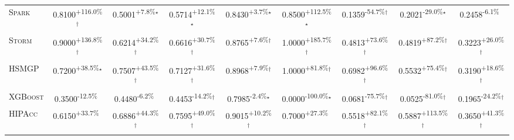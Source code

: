 \begin{table}[htbp]
\begin{tabular}{l|cccc|cccc}
\textsc{Spark} & \cellcolor{green!30}0.8100\textsuperscript{+116.0\%}$^\dagger$ & \cellcolor{green!30}0.5001\textsuperscript{+7.8\%}$^\star$ & \cellcolor{green!30}0.5714\textsuperscript{+12.1\%}$^\star$ & \cellcolor{green!30}0.8430\textsuperscript{+3.7\%}$^\star$ & \cellcolor{green!30}0.8500\textsuperscript{+112.5\%}$^\star$ & \cellcolor{red!30}0.1359\textsuperscript{-54.7\%}$^\dagger$ & \cellcolor{red!30}0.2021\textsuperscript{-29.0\%}$^\star$ & \cellcolor{red!30}0.2458\textsuperscript{-6.1\%}$^{\,\,\,}$ \\
\textsc{Storm} & \cellcolor{green!30}0.9000\textsuperscript{+136.8\%}$^\dagger$ & \cellcolor{green!30}0.6214\textsuperscript{+34.2\%}$^\dagger$ & \cellcolor{green!30}0.6616\textsuperscript{+30.7\%}$^\dagger$ & \cellcolor{green!30}0.8765\textsuperscript{+7.6\%}$^\dagger$ & \cellcolor{green!30}1.0000\textsuperscript{+185.7\%}$^\dagger$ & \cellcolor{green!30}0.4813\textsuperscript{+73.6\%}$^\dagger$ & \cellcolor{green!30}0.4819\textsuperscript{+87.2\%}$^\dagger$ & \cellcolor{green!30}0.3223\textsuperscript{+26.0\%}$^\dagger$ \\
\textsc{HSMGP} & \cellcolor{green!30}0.7200\textsuperscript{+38.5\%}$^\star$ & \cellcolor{green!30}0.7507\textsuperscript{+43.5\%}$^\dagger$ & \cellcolor{green!30}0.7127\textsuperscript{+31.6\%}$^\dagger$ & \cellcolor{green!30}0.8968\textsuperscript{+7.9\%}$^\dagger$ & \cellcolor{green!30}1.0000\textsuperscript{+81.8\%}$^\dagger$ & \cellcolor{green!30}0.6982\textsuperscript{+96.6\%}$^\dagger$ & \cellcolor{green!30}0.5532\textsuperscript{+75.4\%}$^\dagger$ & \cellcolor{green!30}0.3190\textsuperscript{+18.6\%}$^\dagger$ \\
\textsc{XGBoost} & \cellcolor{red!30}0.3500\textsuperscript{-12.5\%}$^{\,\,\,}$ & \cellcolor{red!30}0.4480\textsuperscript{-6.2\%}$^{\,\,\,}$ & \cellcolor{red!30}0.4453\textsuperscript{-14.2\%}$^\dagger$ & \cellcolor{red!30}0.7985\textsuperscript{-2.4\%}$^\star$ & \cellcolor{red!30}0.0000\textsuperscript{-100.0\%}$^\star$ & \cellcolor{red!30}0.0681\textsuperscript{-75.7\%}$^\dagger$ & \cellcolor{red!30}0.0525\textsuperscript{-81.0\%}$^\dagger$ & \cellcolor{red!30}0.1965\textsuperscript{-24.2\%}$^\dagger$ \\
\textsc{HIPAcc} & \cellcolor{green!30}0.6150\textsuperscript{+33.7\%}$^{\,\,\,}$ & \cellcolor{green!30}0.6886\textsuperscript{+44.3\%}$^\dagger$ & \cellcolor{green!30}0.7595\textsuperscript{+49.0\%}$^\dagger$ & \cellcolor{green!30}0.9015\textsuperscript{+10.2\%}$^\dagger$ & \cellcolor{green!30}0.7000\textsuperscript{+27.3\%}$^{\,\,\,}$ & \cellcolor{green!30}0.5518\textsuperscript{+82.1\%}$^\dagger$ & \cellcolor{green!30}0.5887\textsuperscript{+113.5\%}$^\dagger$ & \cellcolor{green!30}0.3650\textsuperscript{+41.3\%}$^\dagger$ \\

\end{tabular}
\end{table}

